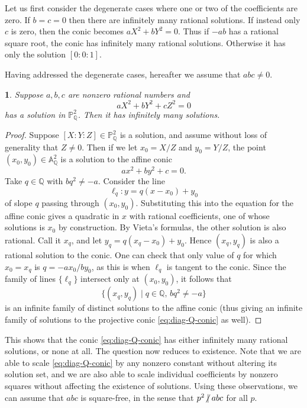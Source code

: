 \documentclass[10pt,a4paper]{amsart}
\numberwithin{equation}{section}
\numberwithin{figure}{section}
\numberwithin{table}{section}
\theoremstyle{definition}
\theoremstyle{plain}
\theoremstyle{remark}
\theoremstyle{plain}
\theoremstyle{definition}
\theoremstyle{plain}
\theoremstyle{plain}
\newtheorem{lem}[thm]{\protect\lemmaname}
\providecommand{\lemmaname}{Lemma}
\newcommand{\A}{\mathbb{A}}
\renewcommand{\P}{\mathbb{P}}
\newcommand{\Q}{\mathbb{Q}}
\newcommand{\ndiv}{\centernot|}
\begin{document}
	Let us first consider the degenerate cases where one or two of the coefficients are zero. If $b=c=0$ then there are infinitely many rational solutions.
	If instead only $c$ is zero, then the conic becomes $aX^2 + bY^2 = 0$. Thus if $-ab$ has a rational square root, the conic has infinitely many rational solutions. Otherwise it has only the solution $[0:0:1]$.
	
	Having addressed the degenerate cases, hereafter we assume that $abc\neq 0$.
	\begin{lem}\label{lem:infinitely-many-Q-soln}
		Suppose $a,b,c$ are nonzero rational numbers and
		\begin{equation}\label{eq:diag-Q-conic}
		aX^2 + bY^2 + cZ^2 = 0
		\end{equation}
		has a solution in $\P^2_\Q$. Then it has infinitely many solutions.
	\end{lem}
	\begin{proof}
		Suppose $[X:Y:Z]\in \P^2_\Q$ is a solution, and assume without loss of generality that $Z\neq 0$. Then if we let $x_0 = X/Z$ and $y_0 = Y/Z$, the point $(x_0,y_0) \in \A^2_\Q$ is a solution to the affine conic
		\[
		ax^2 + by^2 + c = 0.
		\]
		Take $q\in \Q$ with $bq^2 \neq -a$. Consider the line
		\[
		\ell_q\colon y = q(x-x_0) + y_0
		\]
		of slope $q$ passing through $(x_0,y_0)$. Substituting this into the equation for the affine conic gives a quadratic in $x$ with rational coefficients, one of whose solutions is $x_0$ by construction. By Vieta's formulas, the other solution is also rational. Call it $x_q$, and let $y_q = q(x_q - x_0) + y_0$. Hence $(x_q,y_q)$ is also a rational solution to the conic. One can check that only value of $q$ for which $x_0 = x_q$ is $q = -ax_0 / by_0$, as this is when $\ell_q$ is tangent to the conic. Since the family of lines $\{\ell_q\}$ intersect only at $(x_0,y_0)$, it follows that
		\[
		\{(x_q,y_q) \mid q\in\Q,\, bq^2 \neq -a\}
		\]
		is an infinite family of distinct solutions to the affine conic (thus giving an infinite family of solutions to the projective conic \eqref{eq:diag-Q-conic} as well).
	\end{proof}
	This shows that the conic \eqref{eq:diag-Q-conic} has either infinitely many rational solutions, or none at all. The question now reduces to existence. Note that we are able to scale \eqref{eq:diag-Q-conic} by any nonzero constant without altering its solution set, and we are also able to scale individual coefficients by nonzero squares without affecting the existence of solutions. Using these observations, we can assume that $abc$ is square-free, in the sense that $p^2\ndiv abc$ for all $p$.
	
\end{document}
